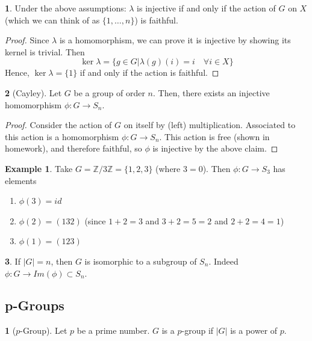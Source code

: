 \documentclass[12pt]{article}
\theoremstyle{definition}
\newtheorem{definition}{\color{NavyBlue}{\textbf{Definition}}}
\newtheorem{theorem}{\color{ForestGreen}{\textbf{Theorem}}}
\newtheorem{example}{\color{WildStrawberry}Example}
\theoremstyle{definition}
\begin{document}
\begin{theorem}
Under the above assumptions: $\lambda$ is injective if and only if the action of $G$ on $X$ (which we can think of as $\{1,\ldots, n\}$) is faithful.
\end{theorem}
\begin{proof}
	Since $\lambda$ is a homomorphism, we can prove it is injective by showing its kernel is trivial. Then
	\begin{equation}
		\ker \lambda = \{g\in G | \lambda(g)(i) = i \quad \forall i \in X\}
	\end{equation}
	Hence, $\ker \lambda = \{1\}$ if and only if the action is faithful.
\end{proof}

\begin{theorem}[Cayley]
	Let $G$ be a group of order $n$. Then, there exists an injective homomorphism $\phi : G \to S_n$.
\end{theorem}
\begin{proof}
	Consider the action of $G$ on itself by (left) multiplication. Associated to this action is a homomorphism $\phi : G \to S_n$. This action is free (shown in homework), and therefore faithful, so $\phi$ is injective by the above claim.
\end{proof}

\begin{example}
	Take $G = \mathbb{Z} / 3 \mathbb{Z} = \{1,2,3\}$ (where $3 = 0$). Then $\phi : G \to S_3$ has elements
	\begin{enumerate}
		\item $\phi(3) = id$
		\item $\phi(2) = (1 3 2)$ (since $1 + 2 = 3$ and $3 + 2 = 5 = 2$ and $2 + 2 = 4 = 1$)
		\item $\phi(1) = (1 2 3)$
	\end{enumerate}
\end{example}

\begin{theorem}
	If $|G| = n$, then $G$ is isomorphic to a subgroup of $S_n$. Indeed $\phi : G \to Im(\phi) \subset S_n$.
\end{theorem}

\subsection{p-Groups}

\begin{definition}[$p$-Group]
	Let $p$ be a prime number. $G$ is a $p$-group if $|G|$ is a power of $p$. 
\end{definition}
\end{document}

